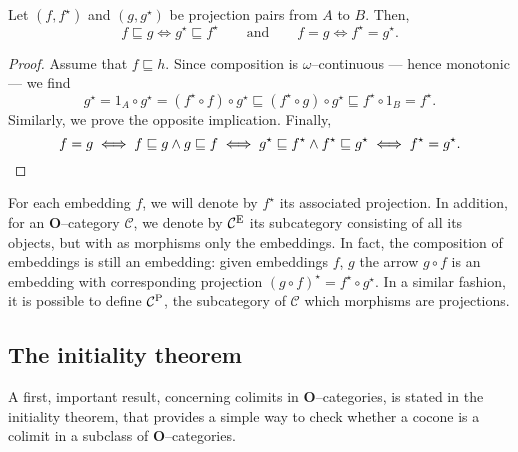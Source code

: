 \begin{lem}
  Let \((f,f^\star)\) and \((g,g^\star)\) be projection pairs from \(A\) to \(B\).
  Then,
  \begin{equation*}
    f \sqsubseteq g \iff g^\star \sqsubseteq f^\star \qquad \text{and} \qquad
    f = g \iff f^\star = g^\star.
  \end{equation*}
\end{lem}
\begin{proof}
  Assume that \(f \sqsubseteq h\). Since composition is \(\omega{}\)--continuous --- hence monotonic --- we find
  \begin{equation*}
    g^\star = 1_A \circ g^\star = (f^\star \circ f) \circ g^\star
    \sqsubseteq (f^\star \circ g) \circ g^\star \sqsubseteq f^\star \circ 1_B = f^\star.
  \end{equation*}
  Similarly, we prove the opposite implication. Finally,
  \begin{equation*}
    f = g \iff f \sqsubseteq g \land g \sqsubseteq f
    \iff g^\star \sqsubseteq f^\star \land f^\star \sqsubseteq g^\star \iff f^\star = g^\star.\qedhere
  \end{equation*}
\end{proof}

For each embedding \(f\), we will denote by \(f^\star\) its associated projection. %
In addition, for an \(\mathbf{O}\)--category \(\mathcal{C}\), we denote by \(\mathcal{C}^\textup{E}\) its subcategory consisting of all its objects, but with as morphisms only the embeddings.
In fact, the composition of embeddings is still an embedding: given embeddings \(f\), \(g\) the arrow \(g \circ f\) is an embedding with corresponding projection \({(g \circ f)}^\star = f^\star \circ g^\star\). %
In a similar fashion, it is possible to define \(\mathcal{C}^\textup{P}\), the subcategory of \(\mathcal{C}\) which morphisms are projections.

\subsection{The initiality theorem}

A first, important result, concerning colimits in \(\mathbf{O}\)--categories, is stated in the initiality theorem, that provides a simple way to check whether a cocone is a colimit in a subclass of \(\mathbf{O}\)--categories.

